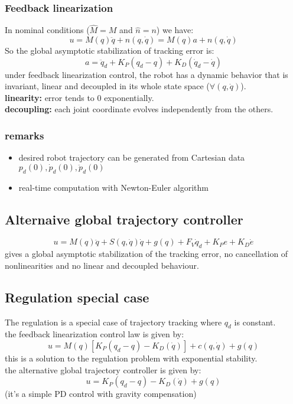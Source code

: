 \documentclass[a4paper,12pt]{article}
\begin{document}
\subsubsection{Feedback linearization}
In nominal conditions ($\hat{M}=M$ and $\hat{n}=n$) we have:
\begin{equation}
    u = M(q)\ddot{q}+ n(q,\dot{q}) = M(q)a + n(q,\dot{q})
\end{equation}
So the global asymptotic stabilization of tracking error is:
\begin{equation}
    a = \ddot{q}_d + K_P(q_d-q) + K_D(\dot{q}_d-\dot{q})
\end{equation}
under feedback linearization control, the robot 
has a dynamic behavior that is
invariant, linear and decoupled in its whole state space
($\forall(q,\dot{q})$).\\
\textbf{linearity:} error tends to 0 exponentially.\\
\textbf{decoupling:} each joint coordinate evolves independently
from the others.
\subsubsection{remarks}
\begin{itemize}
    \item desired robot trajectory can be generated from 
    Cartesian data $p_d(0), \dot{p}_d(0), \ddot{p}_d(0)$
    \item real-time computation with Newton-Euler algorithm
\end{itemize}
\subsection{Alternaive global trajectory controller}
\begin{equation}
u = M(q)\ddot{q} + S(q,\dot{q})\dot{q} + g(q) + F_V\dot{q} _d + K_Pe + K_D\dot{e}
\end{equation}
gives a global asymptotic stabilization of the tracking error,
no cancellation of nonlinearities and no linear and decoupled behaviour.
\subsection{Regulation special case}
The regulation is a special case of trajectory tracking where $q_d$ 
is constant.\\
the feedback linearization control law is given by:
\begin{equation}
    u = M(q)[K_P(q_d-q) - K_D(\dot{q})] + c(q,\dot{q}) + g(q)
\end{equation}
this is a solution to the regulation problem with
exponential stability.\\
the alternative global trajectory controller is given by:
\begin{equation}
    u = K_P(q_d-q) - K_D(\dot{q}) + g(q) 
\end{equation}
(it's a simple PD control with gravity compensation)
\end{document}
